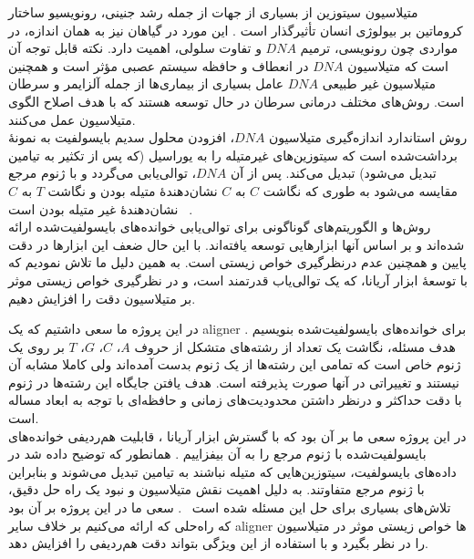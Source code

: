 


متیلاسیون سیتوزین از بسیاری از جهات از جمله رشد جنینی، رونویسیو ساختار کروماتین بر بیولوژی انسان تأثیرگذار است . این مورد در گیاهان نیز به همان اندازه، در مواردی چون رونویسی، ترمیم $DNA$ و تفاوت سلولی، اهمیت دارد. نکته قابل توجه آن است که متیلاسیون $DNA$ در انعطاف و حافظه سیستم عصبی مؤثر است و همچنین متیلاسیون غیر طبیعی $DNA$ عامل بسیاری از بیماری‌ها از جمله آلزایمر و سرطان است. روش‌های مختلف درمانی سرطان در حال توسعه هستند که با هدف اصلاح الگوی متیلاسیون عمل می‌کنند.\\
روش استاندارد اندازه‌گیری متیلاسیون $DNA$، افزودن محلول سدیم بایسولفیت به نمونهٔ برداشت‌شده است که سیتوزین‌های غیرمتیله را به یوراسیل (که پس از تکثیر به تیامین تبدیل می‌شود) تبدیل می‌کند. پس از آن $DNA$، توالی‌یابی می‌گردد و با ژنوم مرجع مقایسه می‌شود به طوری که نگاشت $C$ به $C$ نشان‌دهندهٔ متیله بودن و نگاشت $T$ به $C$ نشان‌دهندهٔ غیر متیله بودن است
~\cite{frith2012mostly}.\\
روش‌ها و الگوریتم‌های گوناگونی برای توالی‌یابی خوانده‌های بایسولفیت‌شده ارائه شده‌اند و بر اساس آنها ابزارهایی توسعه یافته‌اند. با این حال ضعف این ابزارها در دقت پایین و همچنین عدم درنظرگیری خواص زیستی است. به همین دلیل ما تلاش نمودیم که با توسعهٔ ابزار آریانا، که یک توالی‌یاب قدرتمند است، و در نظرگیری خواص زیستی موثر بر متیلاسیون دقت را افزایش دهیم.




در این پروژه ما سعی داشتیم که یک aligner برای خوانده‌های بایسولفیت‌شده بنویسیم . هدف مسئله، نگاشت یک تعداد از رشته‌های متشکل از حروف $A$، $C$، $G$، $T$ بر روی یک ژنوم خاص است که تمامی این رشته‌ها از یک ژنوم بدست آمده‌اند ولی کاملا مشابه آن نیستند و تغییراتی در آنها صورت پذیرفته است. هدف یافتن جایگاه این رشته‌ها در ژنوم با دقت حداکثر و درنظر داشتن محدودیت‌های زمانی و حافظه‌ای با توجه به ابعاد مساله است.\\
در این پروژه سعی ما بر آن بود که با گسترش ابزار آریانا ، قابلیت هم‌ردیفی خوانده‌های بایسولفیت‌شده با ژنوم مرجع را به آن بیفزاییم . همانطور که توضیح داده شد در داده‌های بایسولفیت، سیتوزین‌هایی که متیله نباشند به تیامین تبدیل می‌شوند و بنابراین با ژنوم مرجع متفاوتند. به دلیل اهمیت نقش متیلاسیون و نبود یک راه حل دقیق، تلاش‌های بسیاری برای حل این مسئله شده است
~\cite{krueger2012dna}. 
سعی ما در این پروژه بر آن بود که راه‌حلی که ارائه می‌کنیم بر خلاف سایر aligner ها خواص زیستی موثر در متیلاسیون را در نظر بگیرد و با استفاده از این ویژگی بتواند دقت هم‌ردیفی را افزایش دهد.


